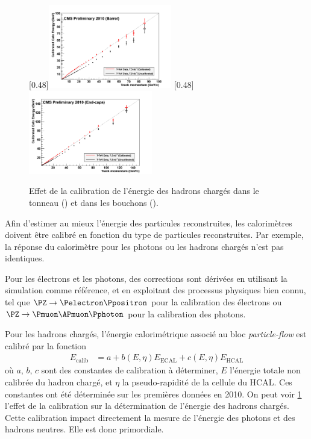 \begin{figure}[tbp]
    \centering
    \subcaptionbox{\label{fig:hadron_calib_barrel}}[0.48\textwidth]{\includegraphics[width=0.48\textwidth]{chapitre3/figs/hadron_calib_barrel.png}} \hfill
    \subcaptionbox{\label{fig:hadron_calib_endcap}}[0.48\textwidth]{\includegraphics[width=0.48\textwidth]{chapitre3/figs/hadron_calib_endcap.png}}
    \caption{Effet de la calibration de l'énergie des hadrons chargés dans le tonneau () et dans les bouchons ().}
    \label{fig:hadron_calib}
\end{figure}

Afin d'estimer au mieux l'énergie des particules reconstruites, les calorimètres doivent être calibré en fonction du type de particules reconstruites. Par exemple, la réponse du calorimètre pour les photons ou les hadrons chargés n'est pas identiques.

Pour les électrons et les photons, des corrections sont dérivées en utilisant la simulation comme référence, et en exploitant des processus physiques bien connu, tel que $\PZ \rightarrow \Pelectron \Ppositron$ pour la calibration des électrons ou $\PZ \rightarrow \Pmuon \APmuon \Pphoton$ pour la calibration des photons.

Pour les hadrons chargés, l'énergie calorimétrique associé au bloc \emph{particle-flow} est calibré par la fonction
\begin{align*}
  E_\text{calib} &= a + b\left(E, \eta\right) E_\text{ECAL} + c\left(E, \eta\right)E_\text{HCAL}
\end{align*}
où $a$, $b$, $c$ sont des constantes de calibration à déterminer, $E$ l'énergie totale non calibrée du hadron chargé, et $\eta$ la pseudo-rapidité de la cellule du HCAL. Ces constantes ont été déterminée sur les premières données en 2010. On peut voir \cref{fig:hadron_calib} l'effet de la calibration sur la détermination de l'énergie des hadrons chargés. Cette calibration impact directement la mesure de l'énergie des photons et des hadrons neutres. Elle est donc primordiale.

